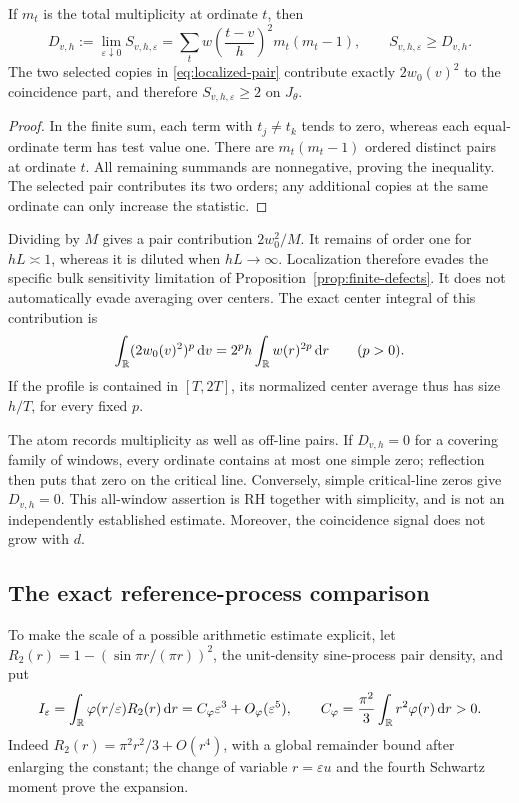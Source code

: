 \begin{proposition}\label{prop:local-atom}
If \(m_t\) is the total multiplicity at ordinate \(t\), then
\begin{equation}\label{eq:local-D}
 D_{v,h}:=\lim_{\varepsilon\downarrow0}S_{v,h,\varepsilon}
 =\sum_t w\!\left(\frac{t-v}{h}\right)^2m_t(m_t-1),
 \qquad S_{v,h,\varepsilon}\ge D_{v,h}.
\end{equation}
The two selected copies in \eqref{eq:localized-pair} contribute exactly
\(2w_0(v)^2\) to the coincidence part, and therefore
\(S_{v,h,\varepsilon}\ge2\) on \(J_\theta\).
\end{proposition}
\begin{proof}
In the finite sum, each term with \(t_j\ne t_k\) tends to zero,
whereas each equal-ordinate term has test value one. There are
\(m_t(m_t-1)\) ordered distinct pairs at ordinate \(t\).
All remaining summands are nonnegative, proving the inequality.
The selected pair contributes its two orders; any additional copies
at the same ordinate can only increase the statistic.
\end{proof}

Dividing by \(M\) gives a pair contribution \(2w_0^2/M\).
It remains of order one for \(hL\asymp1\), whereas it is diluted
when \(hL\to\infty\). Localization therefore evades the specific
bulk sensitivity limitation of Proposition~\ref{prop:finite-defects}.
It does not automatically evade averaging over centers. The exact
center integral of this contribution is
\begin{equation}\label{eq:atom-center-moment}
 \int_\mathbb R(2w_0(v)^2)^p\,\mathrm d v
      =2^p h\int_\mathbb R w(r)^{2p}\,\mathrm d r\qquad(p>0).
\end{equation}
If the profile is contained in \([T,2T]\), its normalized center
average thus has size \(h/T\), for every fixed \(p\).

The atom records multiplicity as well as off-line pairs. If
\(D_{v,h}=0\) for a covering family of windows, every ordinate
contains at most one simple zero; reflection then puts that zero on
the critical line. Conversely, simple critical-line zeros give
\(D_{v,h}=0\). This all-window assertion is RH together with
simplicity, and is not an independently established estimate.
Moreover, the coincidence signal does not grow with \(d\).

\subsection{The exact reference-process comparison}
To make the scale of a possible arithmetic estimate explicit, let
\(R_2(r)=1-(\sin\pi r/(\pi r))^2\), the unit-density sine-process
pair density, and put
\begin{equation}\label{eq:I-epsilon}
 I_\varepsilon=\int_\mathbb R\varphi(r/\varepsilon)R_2(r)\,\mathrm d r
 =C_\varphi\varepsilon^3+O_\varphi(\varepsilon^5),\qquad
 C_\varphi=\frac{\pi^2}{3}\int_\mathbb R r^2\varphi(r)\,\mathrm d r>0.
\end{equation}
Indeed \(R_2(r)=\pi^2r^2/3+O(r^4)\), with a global remainder
bound after enlarging the constant; the change of variable
\(r=\varepsilon u\) and the fourth Schwartz moment prove the expansion.


